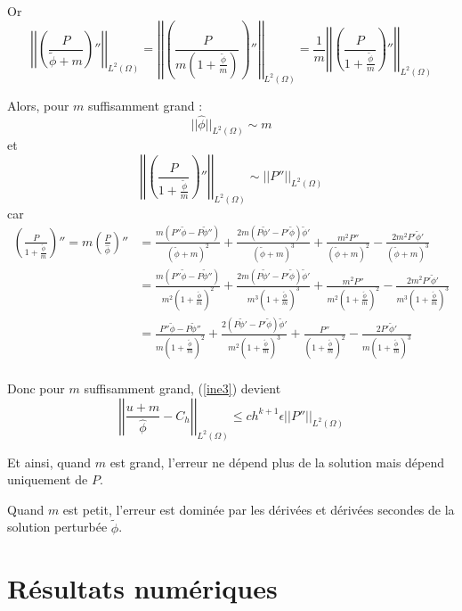 \documentclass[french]{article}
\begin{document}
	Or 
	$$\left|\left|\left(\frac{P}{\tilde{\phi}+m}\right)''\right|\right|_{L^2(\Omega)}=\left|\left|\left(\frac{P}{m\left(1+\frac{\tilde{\phi}}{m}\right)}\right)''\right|\right|_{L^2(\Omega)}=\frac{1}{m}\left|\left|\left(\frac{P}{1+\frac{\tilde{\phi}}{m}}\right)''\right|\right|_{L^2(\Omega)}$$

	Alors, pour $m$ suffisamment grand :
	$$||\hat{\phi}||_{L^2(\Omega)}\sim m$$
	et
	$$\left|\left|\left(\frac{P}{1+\frac{\tilde{\phi}}{m}}\right)''\right|\right|_{L^2(\Omega)}\sim\left|\left|P''\right|\right|_{L^2(\Omega)}$$
	car
	\begin{align*}
		\left(\frac{P}{1+\frac{\tilde{\phi}}{m}}\right)''=m\left(\frac{P}{\hat{\phi}}\right)''&=\frac{m(P''\tilde{\phi}-P\tilde{\phi}'')}{(\tilde{\phi}+m)^2}+\frac{2m(P\tilde{\phi}'-P'\tilde{\phi})\tilde{\phi}'}{(\tilde{\phi}+m)^3}+    \frac{m^2P''}{(\tilde{\phi}+m)^2}-\frac{2m^2P'\tilde{\phi}'}{(\tilde{\phi}+m)^3} \\
		&=\frac{m(P''\tilde{\phi}-P\tilde{\phi}'')}{m^2\left(1+\frac{\tilde{\phi}}{m}\right)^2}+\frac{2m(P\tilde{\phi}'-P'\tilde{\phi})\tilde{\phi}'}{m^3\left(1+\frac{\tilde{\phi}}{m}\right)^3}+    \frac{m^2P''}{m^2\left(1+\frac{\tilde{\phi}}{m}\right)^2}-\frac{2m^2P'\tilde{\phi}'}{m^3\left(1+\frac{\tilde{\phi}}{m}\right)^3} \\
		&=\frac{P''\tilde{\phi}-P\tilde{\phi}''}{m\left(1+\frac{\tilde{\phi}}{m}\right)^2}+\frac{2(P\tilde{\phi}'-P'\tilde{\phi})\tilde{\phi}'}{m^2\left(1+\frac{\tilde{\phi}}{m}\right)^3}+    \frac{P''}{\left(1+\frac{\tilde{\phi}}{m}\right)^2}-\frac{2P'\tilde{\phi}'}{m\left(1+\frac{\tilde{\phi}}{m}\right)^3} \\
	\end{align*}
	
	Donc pour $m$ suffisamment grand, (\ref{ine3}) devient
	\begin{equation}
		\left|\left|\frac{u+m}{\hat{\phi}}-C_h\right|\right|_{L^2(\Omega)}\le ch^{k+1}\epsilon\left|\left|P''\right|\right|_{L^2(\Omega)} \label{ine3_bis}
	\end{equation}
	
	Et ainsi, quand $m$ est grand, l'erreur ne dépend plus de la solution mais dépend uniquement de $P$.
	
	Quand $m$ est petit, l'erreur est dominée par les dérivées et dérivées secondes de la solution perturbée $\tilde{\phi}$.
	
	\section*{Résultats numériques}
	
\end{document}
